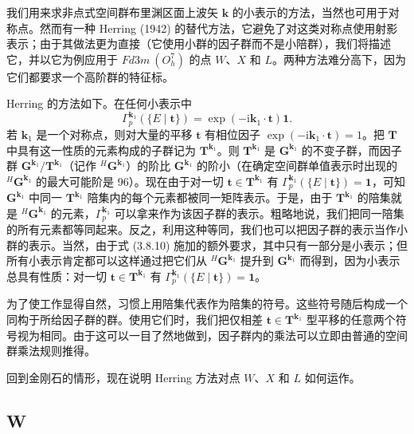 我们用来求非点式空间群布里渊区面上波矢 $\mathbf{k}$ 的小表示的方法，当然也可用于对称点。然而有一种 Herring (1942) 的替代方法，它避免了对这类对称点使用射影表示；由于其做法更为直接（它使用小群的因子群而不是小陪群），我们将描述它，并以它为例应用于 $Fd3m\ (O^{7}_{h})$ 的点 $W$、$X$ 和 $L$。两种方法难分高下，因为它们都要求一个高阶群的特征标。

Herring 的方法如下。在任何小表示中
\begin{equation*}
\Gamma^{\mathbf{k}_{1}}_{p}(\{E \mid \mathbf{t}\}) = \exp(-\mathrm{i}\mathbf{k}_{1} \cdot \mathbf{t})\mathbf{1}.
\tag{3.8.10}
\end{equation*}
若 $\mathbf{k}_{1}$ 是一个对称点，则对大量的平移 $\mathbf{t}$ 有相位因子 $\exp(-\mathrm{i}\mathbf{k}_{1} \cdot \mathbf{t}) = 1$。把 $\mathbf{T}$ 中具有这一性质的元素构成的子群记为 $\mathbf{T}^{\mathbf{k}_{1}}$。则 $\mathbf{T}^{\mathbf{k}_{1}}$ 是 $\mathbf{G}^{\mathbf{k}_{1}}$ 的不变子群，而因子群 $\mathbf{G}^{\mathbf{k}_{1}}/\mathbf{T}^{\mathbf{k}_{1}}$（记作 ${}^{H}\mathbf{G}^{\mathbf{k}_{1}}$）的阶比 $\mathbf{G}^{\mathbf{k}_{1}}$ 的阶小（在确定空间群单值表示时出现的 ${}^{H}\mathbf{G}^{\mathbf{k}_{1}}$ 的最大可能阶是 96）。现在由于对一切 $\mathbf{t} \in \mathbf{T}^{\mathbf{k}_{1}}$ 有 $\Gamma^{\mathbf{k}_{1}}_{p}(\{E \mid \mathbf{t}\}) = \mathbf{1}$，可知 $\mathbf{G}^{\mathbf{k}_{1}}$ 中同一 $\mathbf{T}^{\mathbf{k}_{1}}$ 陪集内的每个元素都被同一矩阵表示。于是，由于 $\mathbf{T}^{\mathbf{k}_{1}}$ 的陪集就是 ${}^{H}\mathbf{G}^{\mathbf{k}_{1}}$ 的元素，$\Gamma^{\mathbf{k}_{1}}_{p}$ 可以拿来作为该因子群的表示。粗略地说，我们把同一陪集的所有元素都等同起来。反之，利用这种等同，我们也可以把因子群的表示当作小群的表示。当然，由于式 (3.8.10) 施加的额外要求，其中只有一部分是小表示；但所有小表示肯定都可以这样通过把它们从 ${}^{H}\mathbf{G}^{\mathbf{k}_{1}}$ 提升到 $\mathbf{G}^{\mathbf{k}_{1}}$ 而得到，因为小表示总具有性质：对一切 $\mathbf{t} \in \mathbf{T}^{\mathbf{k}_{1}}$ 有 $\Gamma^{\mathbf{k}_{1}}_{p}(\{E \mid \mathbf{t}\}) = \mathbf{1}$。

为了使工作显得自然，习惯上用陪集代表作为陪集的符号。这些符号随后构成一个同构于所给因子群的群。使用它们时，我们把仅相差 $\mathbf{t} \in \mathbf{T}^{\mathbf{k}_{1}}$ 型平移的任意两个符号视为相同。由于这可以一目了然地做到，因子群内的乘法可以立即由普通的空间群乘法规则推得。

回到金刚石的情形，现在说明 Herring 方法对点 $W$、$X$ 和 $L$ 如何运作。

\subsection*{W}

